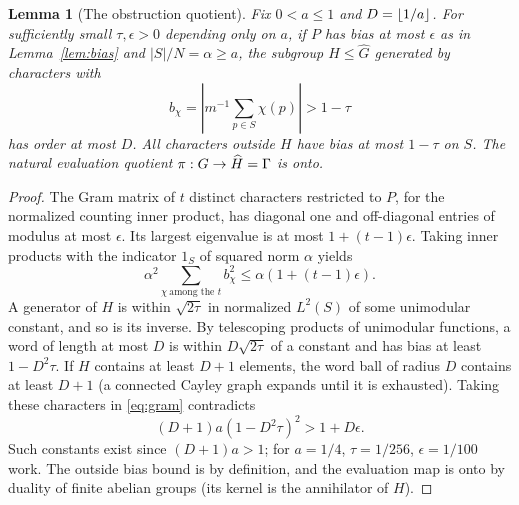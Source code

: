 \documentclass[11pt]{article}
\newtheorem{lemma}[theorem]{Lemma}
\theoremstyle{remark}\newtheorem{remark}[theorem]{Remark}
\begin{document}
\begin{lemma}[The obstruction quotient]\label{lem:quotient}
Fix $0<a\le1$ and $D=\left\lfloor 1/a\right\rfloor$. For sufficiently small $\tau,\epsilon>0$ depending only on $a$, if $P$ has bias at most $\epsilon$ as in Lemma~\ref{lem:bias} and $|S|/N=\alpha\ge a$, the subgroup $H\le\widehat G$ generated by characters with
\[
 b_\chi=\left|m^{-1}\sum_{p\in S}\chi(p)\right|>1-\tau
\]
has order at most $D$. All characters outside $H$ have bias at most $1-\tau$ on $S$. The natural evaluation quotient $\pi:G\to\widehat H=\Gamma$ is onto.
\end{lemma}
\begin{proof}
The Gram matrix of $t$ distinct characters restricted to $P$, for the normalized counting inner product, has diagonal one and off-diagonal entries of modulus at most $\epsilon$. Its largest eigenvalue is at most $1+(t-1)\epsilon$. Taking inner products with the indicator $1_S$ of squared norm $\alpha$ yields
\begin{equation}\label{eq:gram}
 \alpha^2\sum_{\chi\ \text{among the }t}b_\chi^2\le \alpha(1+(t-1)\epsilon).
\end{equation}
A generator of $H$ is within $\sqrt{2\tau}$ in normalized $L^2(S)$ of some unimodular constant, and so is its inverse. By telescoping products of unimodular functions, a word of length at most $D$ is within $D\sqrt{2\tau}$ of a constant and has bias at least $1-D^2\tau$. If $H$ contains at least $D+1$ elements, the word ball of radius $D$ contains at least $D+1$ (a connected Cayley graph expands until it is exhausted). Taking these characters in \eqref{eq:gram} contradicts
\[
 (D+1)a(1-D^2\tau)^2>1+D\epsilon.
\]
Such constants exist since $(D+1)a>1$; for $a=1/4$, $\tau=1/256$, $\epsilon=1/100$ work. The outside bias bound is by definition, and the evaluation map is onto by duality of finite abelian groups (its kernel is the annihilator of $H$).
\end{proof}
\end{document}
